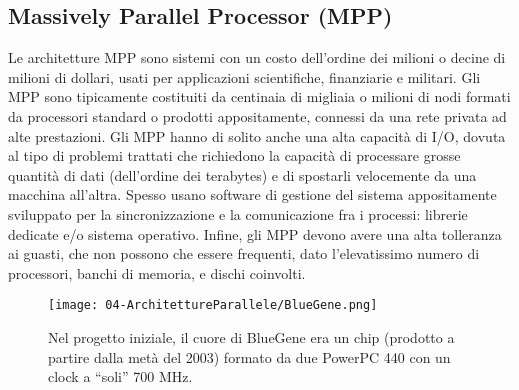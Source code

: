 \subsection{Massively Parallel Processor (MPP)}

Le architetture MPP sono sistemi con un costo dell’ordine dei
milioni o decine di milioni di dollari, usati per applicazioni
scientifiche, finanziarie e militari. Gli MPP sono tipicamente costituiti da centinaia di migliaia o
milioni di nodi formati da processori standard o prodotti
appositamente, connessi da una rete privata ad alte prestazioni. Gli MPP hanno di solito anche una alta capacità di I/O, dovuta al
tipo di problemi trattati che richiedono la capacità di processare
grosse quantità di dati (dell’ordine dei terabytes) e di spostarli
velocemente da una macchina all’altra. Spesso usano software di gestione del sistema appositamente
sviluppato per la sincronizzazione e la comunicazione fra i processi:
librerie dedicate e/o sistema operativo. Infine, gli MPP devono avere una alta tolleranza ai guasti, che non
possono che essere frequenti, dato l’elevatissimo numero di
processori, banchi di memoria, e dischi coinvolti.



\begin{figure}[h]
    \centering
    \texttt{[image: 04-ArchitettureParallele/BlueGene.png]}
    \caption{Nel progetto iniziale, il cuore di BlueGene era un chip (prodotto a
partire dalla metà del 2003) formato da due PowerPC 440 con un
clock a “soli” 700 MHz.}
\end{figure}

